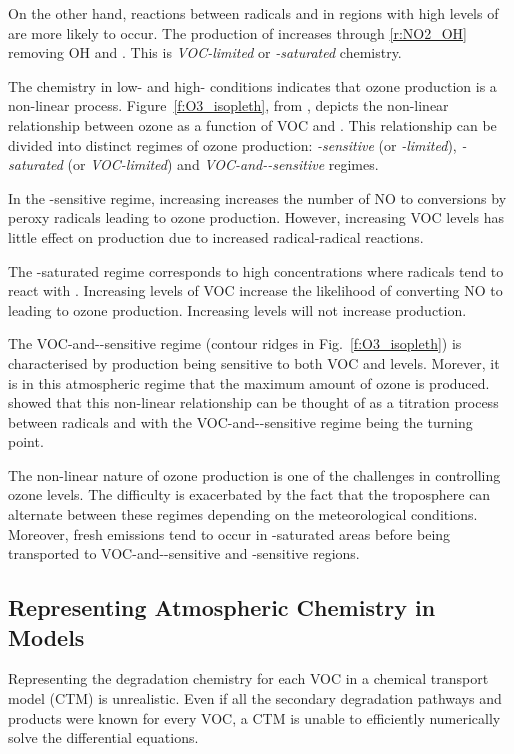 On the other hand, reactions between radicals and  in regions with high levels of  are more likely to occur.
The production of  increases through \eqref{r:NO2_OH} removing OH and .
This is \emph{VOC-limited} or \emph{-saturated} chemistry.

The chemistry in low- and high- conditions indicates that ozone production is a non-linear process.
Figure~\ref{f:O3_isopleth}, from \citet{Jenkin:2000}, depicts the non-linear relationship between ozone as a function of VOC and .
This relationship can be divided into distinct regimes of ozone production: \emph{-sensitive} (or \emph{-limited}), \emph{-saturated} (or \emph{VOC-limited}) and \emph{VOC-and--sensitive} regimes. 

In the -sensitive regime, increasing  increases the number of NO to  conversions by peroxy radicals leading to ozone production.
However, increasing VOC levels has little effect on  production due to increased radical-radical reactions.

The -saturated regime corresponds to high  concentrations where radicals tend to react with . 
Increasing levels of VOC increase the likelihood of  converting NO to  leading to ozone production.
Increasing  levels will not increase  production.

The VOC-and--sensitive regime (contour ridges in Fig.~\ref{f:O3_isopleth}) is characterised by  production being sensitive to both VOC and  levels. 
Morever, it is in this atmospheric regime that the maximum amount of ozone is produced.
\citet{Kleinman:1994} showed that this non-linear relationship can be thought of as a titration process between radicals and  with the VOC-and--sensitive regime being the turning point.

The non-linear nature of ozone production is one of the challenges in controlling ozone levels.
The difficulty is exacerbated by the fact that the troposphere can alternate between these regimes depending on the meteorological conditions.
Moreover, fresh emissions tend to occur in -saturated areas before being transported to VOC-and--sensitive and -sensitive regions.

\subsection{Representing Atmospheric Chemistry in Models} \label{ss:chemistry_models}
Representing the degradation chemistry for each VOC in a chemical transport model (CTM) is unrealistic.
Even if all the secondary degradation pathways and products were known for every VOC, a CTM is unable to efficiently numerically solve the differential equations.


